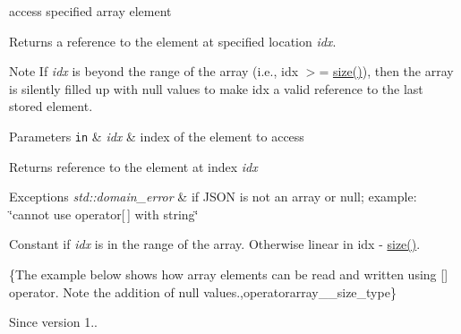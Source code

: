 access specified array element 

Returns a reference to the element at specified location {\itshape idx}.

\begin{DoxyNote}{Note}
If {\itshape idx} is beyond the range of the array (i.\+e., {\ttfamily idx $>$= \hyperlink{a00025_a01833b332b68d9af1f7cd7a816c39e49}{size()}}), then the array is silently filled up with {\ttfamily null} values to make {\ttfamily idx} a valid reference to the last stored element.
\end{DoxyNote}

\begin{DoxyParams}[1]{Parameters}
\mbox{\tt in}  & {\em idx} & index of the element to access\\
\hline
\end{DoxyParams}
\begin{DoxyReturn}{Returns}
reference to the element at index {\itshape idx} 
\end{DoxyReturn}

\begin{DoxyExceptions}{Exceptions}
{\em std\+::domain\+\_\+error} & if J\+S\+ON is not an array or null; example\+: {\ttfamily \char`\"{}cannot
use operator\mbox{[}$\,$\mbox{]} with string\char`\"{}}\\
\hline
\end{DoxyExceptions}
Constant if {\itshape idx} is in the range of the array. Otherwise linear in {\ttfamily idx -\/ \hyperlink{a00025_a01833b332b68d9af1f7cd7a816c39e49}{size()}}.

\{The example below shows how array elements can be read and written using {\ttfamily \mbox{[}\mbox{]}} operator. Note the addition of {\ttfamily null} values.,operatorarray\+\_\+\+\_\+size\+\_\+type\}

\begin{DoxySince}{Since}
version 1.. 
\end{DoxySince}
